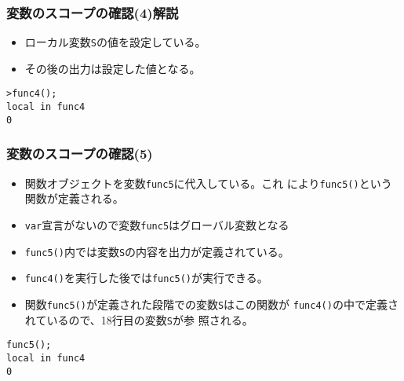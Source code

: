 \begin{frame}[containsverbatim]
\frametitle{変数のスコープの確認(4)解説}
\begin{itemize}
 \item ローカル変数\Verb+S+の値を設定している。
 \item その後の出力は設定した値となる。
\end{itemize}
\begin{Verbatim}
>func4();
local in func4
0
\end{Verbatim}
\end{frame}
\begin{frame}[containsverbatim]
\frametitle{変数のスコープの確認(5)}
\begin{itemize}
 \item 関数オブジェクトを変数\Verb+func5+に代入している。これ
       により\Verb+func5()+という関数が定義される。
 \item \Verb+var+宣言がないので変数\Verb+func5+はグローバル変数となる
  \item \Verb+func5()+内では変数\Verb+S+の内容を出力が定義されている。
 \item \Verb+func4()+を実行した後では\Verb+func5()+が実行できる。
 \item 関数\Verb+func5()+が定義された段階での変数\Verb+S+はこの関数が
       \Verb+func4()+の中で定義されているので、18行目の変数\Verb+S+が参
       照される。
\end{itemize}
\begin{Verbatim}
func5();
local in func4
0
\end{Verbatim}
\end{frame}
